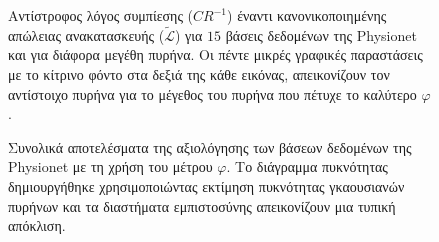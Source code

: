 \begin{figure}
	
	\caption[Αντίστροφος λόγος συμπίεσης ($CR^{-1}$) έναντι κανονικοποιημένης απώλειας ανακατασκευής ($\tilde{\mathcal{L}}$) για $15$ βάσεις δεδομένων της Physionet και για διάφορα μεγέθη πυρήνα.]{Αντίστροφος λόγος συμπίεσης ($CR^{-1}$) έναντι κανονικοποιημένης απώλειας ανακατασκευής ($\tilde{\mathcal{L}}$) για $15$ βάσεις δεδομένων της Physionet και για διάφορα μεγέθη πυρήνα.
	Οι πέντε μικρές γραφικές παραστάσεις με το κίτρινο φόντο στα δεξιά της κάθε εικόνας, απεικονίζουν τον αντίστοιχο πυρήνα για το μέγεθος του πυρήνα που πέτυχε το καλύτερο $\varphi$.}
	\label{fig:crrl}
\end{figure}

\begin{figure}
	\centering
	\caption{Συνολικά αποτελέσματα της αξιολόγησης των βάσεων δεδομένων της Physionet με τη χρήση του μέτρου $\varphi$.
	Το διάγραμμα πυκνότητας δημιουργήθηκε χρησιμοποιώντας εκτίμηση πυκνότητας γκαουσιανών πυρήνων και τα διαστήματα εμπιστοσύνης απεικονίζουν μια τυπική απόκλιση.}
	\label{fig:flethos}
\end{figure}

